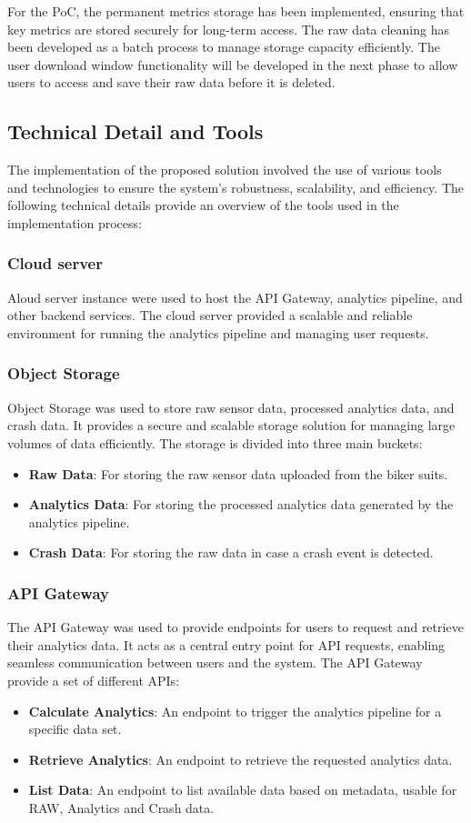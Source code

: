 For the PoC, the permanent metrics storage has been implemented, ensuring that key metrics are stored securely for long-term access. The raw data cleaning has been developed as a batch process to manage storage capacity efficiently. The user download window functionality will be developed in the next phase to allow users to access and save their raw data before it is deleted.

\subsection{Technical Detail and Tools}
The implementation of the proposed solution involved the use of various tools and technologies to ensure the system's robustness, scalability, and efficiency. The following technical details provide an overview of the tools used in the implementation process:
\subsubsection{Cloud server}
Aloud server instance were used to host the API Gateway, analytics pipeline, and other backend services. The cloud server provided a scalable and reliable environment for running the analytics pipeline and managing user requests.

\subsubsection{Object Storage}
Object Storage was used to store raw sensor data, processed analytics data, and crash data. It provides a secure and scalable storage solution for managing large volumes of data efficiently.
The storage is divided into three main buckets:
\begin{itemize}
    \item \textbf{Raw Data}: For storing the raw sensor data uploaded from the biker suits.
    \item \textbf{Analytics Data}: For storing the processed analytics data generated by the analytics pipeline.
    \item \textbf{Crash Data}: For storing the raw data in case a crash event is detected.
\end{itemize}

\subsubsection{API Gateway}
The API Gateway was used to provide endpoints for users to request and retrieve their analytics data. It acts as a central entry point for API requests, enabling seamless communication between users and the system.
The API Gateway provide a set of different APIs:
\begin{itemize}
    \item \textbf{Calculate Analytics}: An endpoint to trigger the analytics pipeline for a specific data set.
    \item \textbf{Retrieve Analytics}: An endpoint to retrieve the requested analytics data.
    \item \textbf{List Data}: An endpoint to list available data based on metadata, usable for RAW, Analytics and Crash data.
\end{itemize}

